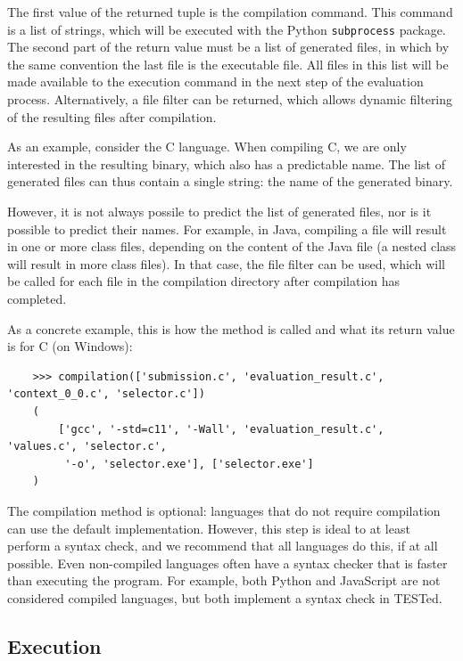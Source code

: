 \documentclass[../main]{subfiles}
\begin{document}
The first value of the returned tuple is the compilation command.
This command is a list of strings, which will be executed with the Python \texttt{subprocess} package.
The second part of the return value must be a list of generated files, in which by the same convention the last file is the executable file.
All files in this list will be made available to the execution command in the next step of the evaluation process.
Alternatively, a file filter can be returned, which allows dynamic filtering of the resulting files after compilation.

As an example, consider the C language.
When compiling C, we are only interested in the resulting binary, which also has a predictable name.
The list of generated files can thus contain a single string: the name of the generated binary.

However, it is not always possile to predict the list of generated files, nor is it possible to predict their names.
For example, in Java, compiling a file will result in one or more class files, depending on the content of the Java file (a nested class will result in more class files).
In that case, the file filter can be used, which will be called for each file in the compilation directory after compilation has completed.

As a concrete example, this is how the method is called and what its return value is for C (on Windows):

\begin{verbatim}
    >>> compilation(['submission.c', 'evaluation_result.c', 'context_0_0.c', 'selector.c'])
    (
        ['gcc', '-std=c11', '-Wall', 'evaluation_result.c', 'values.c', 'selector.c',
         '-o', 'selector.exe'], ['selector.exe']
    )
\end{verbatim}

The compilation method is optional: languages that do not require compilation can use the default implementation.
However, this step is ideal to at least perform a syntax check, and we recommend that all languages do this, if at all possible.
Even non-compiled languages often have a syntax checker that is faster than executing the program.
For example, both Python and JavaScript are not considered compiled languages, but both implement a syntax check in TESTed.

\subsection{Execution}\label{subsec:impl-execution}
\end{document}
